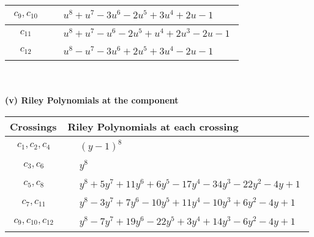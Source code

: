 \documentclass[1p]{elsarticle_modified}
\theoremstyle{definition}
\begin{document}
\begin{tabular}{m{50pt}|m{274pt}}
\hline $$\begin{aligned}c_{9},c_{10}\end{aligned}$$&$\begin{aligned}
&u^8+u^7-3 u^6-2 u^5+3 u^4+2 u-1
\end{aligned}$\\
\hline $$\begin{aligned}c_{11}\end{aligned}$$&$\begin{aligned}
&u^8+u^7- u^6-2 u^5+u^4+2 u^3-2 u-1
\end{aligned}$\\
\hline $$\begin{aligned}c_{12}\end{aligned}$$&$\begin{aligned}
&u^8- u^7-3 u^6+2 u^5+3 u^4-2 u-1
\end{aligned}$\\
\hline
\end{tabular}\\~\\
\newpage\renewcommand{\arraystretch}{1}
\flushleft \textbf{(v) Riley Polynomials at the component}\newline \\
\begin{tabular}{m{50pt}|m{274pt}}
Crossings & \hspace{64pt}Riley Polynomials at each crossing \\
\hline $$\begin{aligned}c_{1},c_{2},c_{4}\end{aligned}$$&$\begin{aligned}
&(y-1)^8
\end{aligned}$\\
\hline $$\begin{aligned}c_{3},c_{6}\end{aligned}$$&$\begin{aligned}
&y^8
\end{aligned}$\\
\hline $$\begin{aligned}c_{5},c_{8}\end{aligned}$$&$\begin{aligned}
&y^8+5 y^7+11 y^6+6 y^5-17 y^4-34 y^3-22 y^2-4 y+1
\end{aligned}$\\
\hline $$\begin{aligned}c_{7},c_{11}\end{aligned}$$&$\begin{aligned}
&y^8-3 y^7+7 y^6-10 y^5+11 y^4-10 y^3+6 y^2-4 y+1
\end{aligned}$\\
\hline $$\begin{aligned}c_{9},c_{10},c_{12}\end{aligned}$$&$\begin{aligned}
&y^8-7 y^7+19 y^6-22 y^5+3 y^4+14 y^3-6 y^2-4 y+1
\end{aligned}$\\
\hline
\end{tabular}\\~\\
\end{document}
